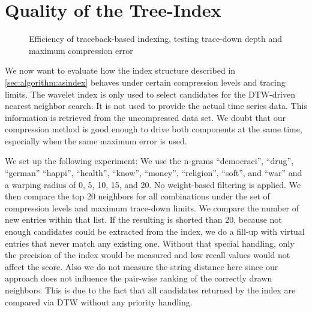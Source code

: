 \section{Quality of the Tree-Index}
\label{sec:evaluation:tb}

\begin{figure}
    \centering
    
    \caption{Efficiency of traceback-based indexing, testing trace-down depth and maximum compression error}\label{fig:tbindex}
\end{figure}

We now want to evaluate how the index structure described in \autoref{sec:algorithm:asindex} behaves under certain compression levels and tracing limits. The wavelet index is only used to select candidates for the DTW-driven nearest neighbor search. It is not used to provide the actual time series data. This information is retrieved from the uncompressed data set. We doubt that our compression method is good enough to drive both components at the same time, especially when the same maximum error is used.

We set up the following experiment: We use the n-grams \enquote{democraci}, \enquote{drug}, \enquote{german} \enquote{happi}, \enquote{health}, \enquote{know}, \enquote{money}, \enquote{religion}, \enquote{soft}, and \enquote{war} and a warping radius of \num{0}, \num{5}, \num{10}, \num{15}, and \num{20}. No weight-based filtering is applied. We then compare the top \num{20} neighbors for all combinations under the set of compression levels and maximum trace-down limits. We compare the number of new entries within that list. If the resulting is shorted than \num{20}, because not enough candidates could be extracted from the index, we do a fill-up with virtual entries that never match any existing one. Without that special handling, only the precision of the index would be measured and low recall values would not affect the score. Also we do not measure the string distance here since our approach does not influence the pair-wise ranking of the correctly drawn neighbors. This is due to the fact that all candidates returned by the index are compared via DTW without any priority handling.

